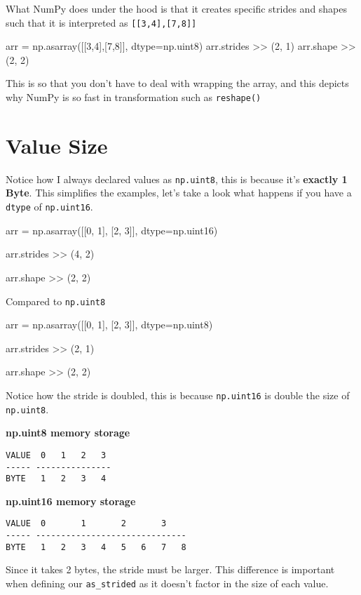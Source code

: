 \documentclass[oneside, 12pt]{report}
\begin{document}
What NumPy does under the hood is that it creates specific strides and shapes such that it is interpreted as \verb+[[3,4],[7,8]]+

\begin{python}
arr = np.asarray([[3,4],[7,8]], dtype=np.uint8)
arr.strides
>> (2, 1)
arr.shape
>> (2, 2)
\end{python}

This is so that you don't have to deal with wrapping the array, and this depicts why NumPy is so fast in transformation such as \verb+reshape()+

\section{Value Size}

Notice how I always declared values as \verb+np.uint8+, this is because it's \textbf{exactly 1 Byte}. This simplifies the examples, let's take a look what happens if you have a \verb+dtype+ of \verb+np.uint16+.

\begin{python}
arr = np.asarray([[0, 1], [2, 3]], dtype=np.uint16)

arr.strides
>> (4, 2)

arr.shape
>> (2, 2)
\end{python}

Compared to \verb+np.uint8+

\begin{python}
arr = np.asarray([[0, 1], [2, 3]], dtype=np.uint8)

arr.strides
>> (2, 1)

arr.shape
>> (2, 2)
\end{python}

Notice how the stride is doubled, this is because \verb+np.uint16+ is double the size of \verb+np.uint8+.

\textbf{np.uint8 memory storage}
\begin{verbatim}
VALUE  0   1   2   3
----- ---------------
BYTE   1   2   3   4
\end{verbatim}

\textbf{np.uint16 memory storage}
\begin{verbatim}
VALUE  0       1       2       3   
----- ------------------------------
BYTE   1   2   3   4   5   6   7   8
\end{verbatim}

Since it takes 2 bytes, the stride must be larger. This difference is important when defining our \verb+as_strided+ as it doesn't factor in the size of each value.
\end{document}
